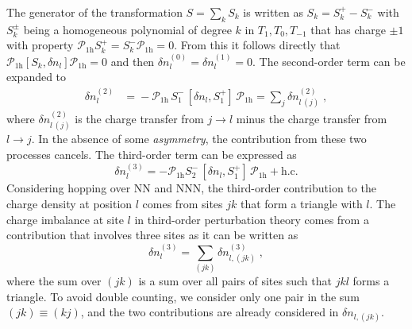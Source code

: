 The generator of the transformation $S=\sum_k S_k$ is written as $S_k=S_k^+-S_k^-$ with $S_k^{\pm}$ being a homogeneous polynomial of degree $k$ in $T_{1},T_0,T_{-1}$ that has charge $\pm 1$ with property $\mathcal{P}_{1\text{h}}S_k^+ = S_k^-\mathcal{P}_{1\text{h}} =0$. From this it follows directly that $\mathcal{P}_{1\text{h}} [S_k, \delta {n}_l ] \mathcal{P}_{1\text{h}} = 0$ and then $\delta n_l^{(0)}=\delta n_l^{(1)}=0$.
The second-order term can be expanded to
    \begin{equation}
\begin{split}
    \delta n_l^{(2)}
    \!&=\!  - \mathcal{P}_{1\text{h}} \, S_1^{-} \, [ \delta {n}_l, S_1^{+} ]\,  \mathcal{P}_{1\text{h}} = \sum_{j} \delta n_{l \,(j)}^{(2)} \; ,
\end{split}
\end{equation} where %
$\delta n_{l \,(j)}^{(2)}$  is the charge transfer from $j\to l$ minus the charge transfer from $l \to j$.
In the absence of some \textit{asymmetry}, the contribution from these two processes cancels.
The third-order term can be expressed as
\begin{equation}
    \delta n_l^{(3)} = - \mathcal{P}_{1\text{h}} S_2^{-}\,[ \delta {n}_l, S_1^{+} ]  \,\mathcal{P}_{1\text{h}} + \text{h.c.}
\end{equation}
Considering hopping over NN and NNN, the third-order contribution to the charge density at position $l$ comes from sites $jk$ that form a triangle with $l$.  The charge imbalance at site $l$ in third-order perturbation theory comes from a contribution that involves three sites as it can be written as
\begin{equation}
    \delta n_l^{(3)} = \sum_{(jk)} \delta n_{l,(jk)}^{(3)} \; ,
\end{equation}
where the sum over $(jk)$ is a sum over all pairs of sites such that $jkl$ forms a triangle. To avoid double counting, we consider only one pair in the sum $(jk)\equiv(kj)$, and the two contributions are already considered in $\delta n_{l,(jk)}$.

